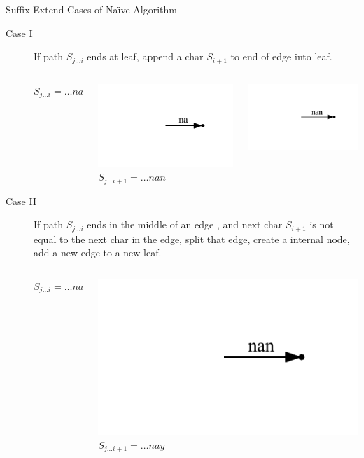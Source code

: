 \begin{frame}[shrink=20]{Suffix Extend Cases of Na\"{\i}ve Algorithm}
\begin{description}
\item[Case I] If path $S_{j\ldots i}$ ends at leaf, append a char $S_{i+1}$
to end of edge into leaf.
\begin{columns}
$S_{j\ldots i} = \ldots na$ 

\includegraphics[trim=80pt 35pt 80pt 35pt]{na.pdf}
{\huge \MVRightarrow}
$S_{j\ldots i+1} = \ldots nan$ 

\includegraphics[trim=80pt 35pt 80pt 35pt]{nan.pdf}
\end{columns}
\item[Case II] If path $S_{j...i}$ ends in the middle of an edge ,
and next char $S_{i+1}$ is \alert{not equal} to the next char in the edge,
split that edge, create a internal node, add a new edge to a new leaf.
\begin{columns}
$S_{j\ldots i} = \ldots na$ 

\includegraphics[trim=80pt 35pt 80pt 35pt]{nan.pdf}
{\huge \MVRightarrow}
$S_{j\ldots i+1} = \ldots nay$ 


\end{columns}
\end{description}
\end{frame}
